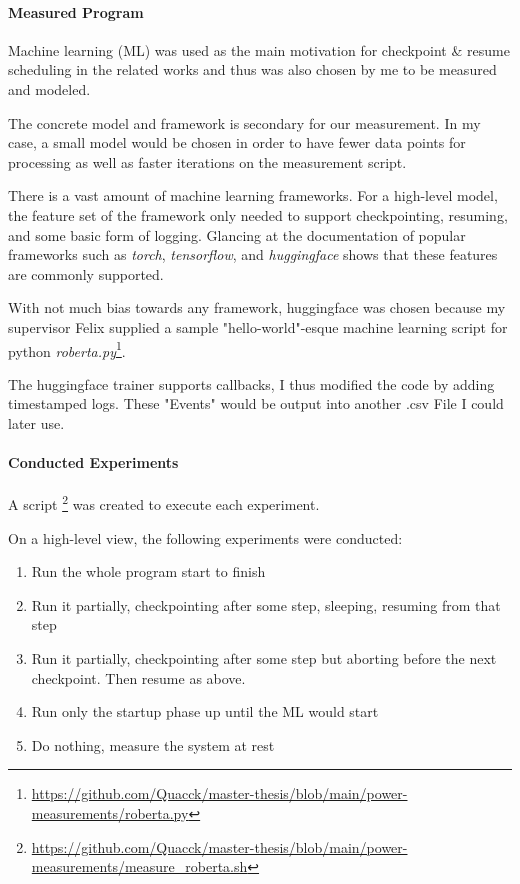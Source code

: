 \paragraph{Measured Program}

Machine learning (ML) was used as the main motivation for checkpoint \& resume scheduling in the related works\cite {wiesner_lets_2021} and thus was also chosen by me to be measured and modeled. 

The concrete model and framework is secondary for our measurement. In my case, a small model would be chosen in order to have fewer data points for processing as well as faster iterations on the measurement script. 

There is a vast amount of machine learning frameworks. For a high-level model, the feature set of the framework only needed to support checkpointing, resuming, and some basic form of logging. 
Glancing at the documentation of popular frameworks such as \emph{torch}, \emph{tensorflow}, and \emph{huggingface} shows that these features are commonly supported. 

With not much bias towards any framework, huggingface was chosen because my supervisor Felix supplied a sample "hello-world"-esque machine learning script for python \emph{roberta.py}\footnote{\url{https://github.com/Quacck/master-thesis/blob/main/power-measurements/roberta.py}}.

The huggingface trainer supports callbacks, I thus modified the code by adding timestamped logs. These "Events" would be output into another .csv File I could later use.

\paragraph{Conducted Experiments}

A script \footnote{\url{https://github.com/Quacck/master-thesis/blob/main/power-measurements/measure_roberta.sh}} was created to execute each experiment. 

On a high-level view, the following experiments were conducted: 

\begin{enumerate}
    \item \label{experiment:full}Run the whole program start to finish
    \item \label{experiment:partial_checkpointed}Run it partially, checkpointing after some step, sleeping, resuming from that step
    \item \label{experiment:partial_checkpointed_aborted}Run it partially, checkpointing after some step but aborting before the next checkpoint. Then resume as above.
    \item \label{experiment:startup_only}Run only the startup phase up until the ML would start
    \item \label{experiment:baseline}Do nothing, measure the system at rest
\end{enumerate}

